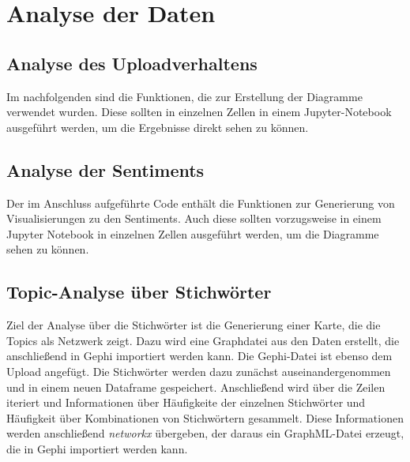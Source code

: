 \documentclass[12pt]{article}
\begin{document}
\begin{sloppypar}
	

	\section{Analyse der Daten}

	\subsection{Analyse des Uploadverhaltens}

	Im nachfolgenden sind die Funktionen, die zur Erstellung der Diagramme
	verwendet wurden. Diese sollten in einzelnen Zellen in einem
	Jupyter-Notebook ausgeführt werden, um die Ergebnisse direkt sehen zu
	können.

	

	\subsection{Analyse der Sentiments}

	Der im Anschluss aufgeführte Code enthält die Funktionen zur Generierung von
	Visualisierungen zu den Sentiments. Auch diese sollten vorzugsweise in einem
	Jupyter Notebook in einzelnen Zellen ausgeführt werden, um die Diagramme
	sehen zu können.

	

	\subsection{Topic-Analyse über Stichwörter}

	Ziel der Analyse über die Stichwörter ist die Generierung einer Karte, die
	die Topics als Netzwerk zeigt. Dazu wird eine Graphdatei aus den Daten
	erstellt, die anschließend in Gephi importiert werden kann. Die Gephi-Datei
	ist ebenso dem Upload angefügt. Die Stichwörter werden dazu zunächst
	auseinandergenommen und in einem neuen Dataframe gespeichert. Anschließend
	wird über die Zeilen iteriert und Informationen über Häufigkeite der
	einzelnen Stichwörter und Häufigkeit über Kombinationen von Stichwörtern
	gesammelt. Diese Informationen werden anschließend \emph{networkx}
	übergeben, der daraus ein GraphML-Datei erzeugt, die in Gephi importiert
	werden kann.


\end{sloppypar}
\end{document}
